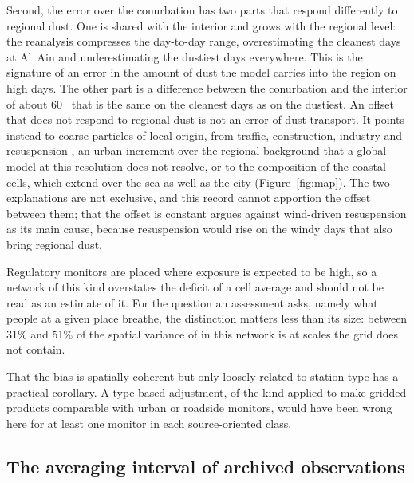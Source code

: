 Second, the error over the conurbation has two parts that respond differently to regional dust.
One is shared with the interior and grows with the regional level: the reanalysis compresses the
day-to-day range, overestimating the cleanest days at Al~Ain and underestimating the dustiest
days everywhere. This is the signature of an error in the amount of dust the model carries into
the region on high days. The other part is a difference between the
conurbation and the interior of about 60~\ugm{} that is the same on the cleanest days as on the
dustiest. An offset that does not respond to regional dust is not an error of dust transport. It
points instead to coarse particles of local origin, from traffic, construction, industry and resuspension \citep{thorpe2008,amato2009}, an urban
increment over the regional background \citep{lenschow2001} that a global model at this
resolution does not resolve, or to the composition of
the coastal cells, which extend over the sea as well as the city (Figure~\ref{fig:map}). The two
explanations are not exclusive, and this record cannot apportion the offset between them; that the
offset is constant argues against wind-driven resuspension as its main cause, because
resuspension would rise on the windy days that also bring regional dust.

Regulatory monitors are placed where exposure is expected to be high, so a network of this kind
overstates the deficit of a cell average and should not be read as an estimate of it. For the
question an assessment asks, namely what people at a given place breathe, the distinction matters
less than its size: between 31\% and 51\% of the spatial variance of \pmten{} in this
network is at scales the grid does not contain.

That the bias is spatially coherent but only loosely related to station type has a practical
corollary. A type-based adjustment, of the kind applied to make gridded products comparable with
urban or roadside monitors, would have been wrong here for at least one monitor in each
source-oriented class.

\subsection{The averaging interval of archived observations}

